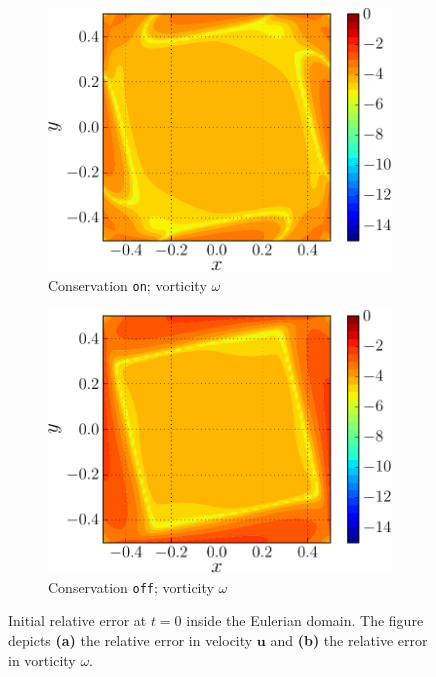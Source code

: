 \begin{figure}[h]
    \begin{subfigure}[t]{0.45\textwidth}
             \includegraphics[width=\linewidth]{./figures/hybrid/lambOseent2/lambOseen_fully_wErrorFinal_compressed-crop.pdf}
             \caption{Conservation \texttt{on}; vorticity $\omega$}
             \label{fig:lambOseen_fullyCon_wErrorFinal}
     \end{subfigure}%
     \qquad     
     \begin{subfigure}[t]{0.45\textwidth}
             \includegraphics[width=\linewidth]{./figures/hybrid/lambOseent2/lambOseen_fullyCoff_wErrorFinal_compressed-crop.pdf}
             \caption{Conservation \texttt{off}; vorticity $\omega$}
             \label{fig:lambOseen_fullyCoff_wErrorFinal}
     \end{subfigure}  

           
  
     \caption{Initial relative error at $t=0$ inside the Eulerian domain. The figure depicts \textbf{(a)} the relative error in velocity $\mathbf{u}$ and \textbf{(b)} the relative error in vorticity $\omega$.}
     \label{fig:lambOseen_conservation_contourf}
	\end{figure}


